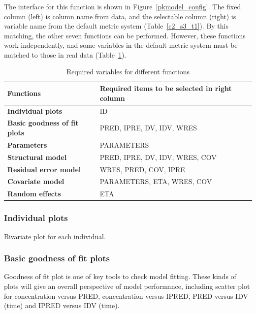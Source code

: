 \documentclass[a4paper]{article}
\begin{document}
\newline
\newline
The interface for this function is shown in Figure~\ref{pkmodel_config}. The fixed column (left) is column name from data, and the selectable column (right) is variable name from the default metric system (Table~\ref{c2_s3_t1}). By this matching, the other seven functions can be performed. However, these functions work independently, and some variables in the default metric system must be matched to those in real data (Table~\ref{c2_s3_t12}).

\begin{table}[h!tb] \centering
\begin{tabular}{ll} \hline
\textbf{Functions} & \textbf{Required items to be selected in right column}  \\ \hline
\textbf{Individual plots} & ID \\
\textbf{Basic goodness of fit plots} & PRED, IPRE, DV, IDV, WRES \\
\textbf{Parameters} & PARAMETERS \\
\textbf{Structural model} & PRED, IPRE, DV, IDV, WRES, COV \\
\textbf{Residual error model} & WRES, PRED, COV, IPRE \\
\textbf{Covariate model} & PARAMETERS, ETA, WRES, COV \\
\textbf{Random effects} & ETA \\
\hline
\end{tabular}
\caption{Required variables for different functions}
\label{c2_s3_t12}
\end{table}
\subsubsection{Individual plots}
Bivariate plot for each individual.
\subsubsection{Basic goodness of fit plots}
Goodness of fit plot is one of key tools to check model fitting. 
These kinds of plots will give an overall perspective of model performance, 
including scatter plot for concentration versus PRED, concentration versus IPRED, 
PRED versus IDV (time) and IPRED versus IDV (time).
\end{document}
